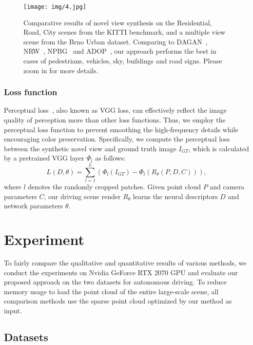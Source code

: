 \documentclass[sigconf]{acmart}
\begin{document}
\begin{figure*}[t]
  \centering
  \texttt{[image: img/4.jpg]}
  \caption{Comparative results of novel view synthesis on the Residential, Road, City scenes from the KITTI benchmark, and a multiple view scene from the Brno Urban dataset. 
  Comparing to DAGAN~\cite{tang2020dual}, NRW~\cite{meshry2019neural}, NPBG~\cite{aliev2020neural} and ADOP~\cite{ruckert2021adop}, our approach performs the best in cases of pedestrians, vehicles, sky, buildings and road signs. Please zoom in for more details.}
   \label{fig:label6}
\end{figure*}


\subsubsection{Loss function}
Perceptual loss~\cite{johnson2016perceptual}, also known as VGG loss, can effectively reflect the image quality of perception more than other loss functions. Thus, we employ the perceptual loss function to prevent smoothing the high-frequency details while encouraging color preservation. Specifically, we compute the perceptual loss between the synthetic novel view and ground truth image $I_{GT}$, which is calculated by a pretrained VGG layer $\Phi_{l}$ as follows:
\begin{equation}
L\left(D, \theta\right)=\sum_{l=1}^L \left(\Phi_{l}\left(I_{GT}\right)-\Phi_{l}\left(R_{\theta}\left(P,D,C \right)\right)\right),
\end{equation}
where $l$ denotes the randomly cropped patches. Given point cloud $P$ and camera parameters $C$, our driving scene render $R_{\theta}$ learns the neural descriptors $D$ and network parameters $\theta$. 




\section{Experiment}
To fairly compare the qualitative and quantitative results of various methods, we conduct the experiments on Nvidia GeForce RTX 2070 GPU and evaluate our proposed approach on the two datasets for autonomous driving. To reduce memory usage to load the point cloud of the entire large-scale scene, all comparison methods use the sparse point cloud optimized by our method as input.


\subsection{Datasets}
\end{document}
